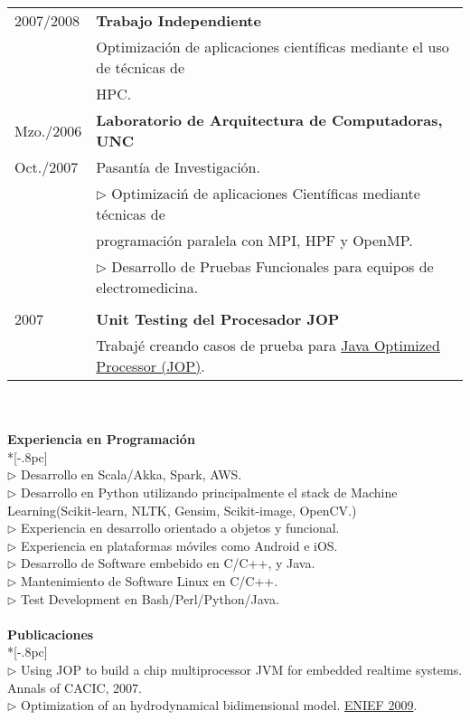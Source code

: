 \documentclass[a4paper,11pt,english]{article}
\begin{document}
\begin{tabular}{ p{2cm} l }
   2007/2008    & {\bf Trabajo Independiente}\\
		& Optimizaci\'on de aplicaciones cient\'ificas mediante el uso de t\'ecnicas de \\
                & HPC.\\
   Mzo./2006    & {\bf Laboratorio de Arquitectura de Computadoras, UNC}\\
   Oct./2007    & Pasant\'ia de Investigaci\'on.\\
		&$\triangleright$ Optimizaci\'n de aplicaciones Cient\'ificas mediante t\'ecnicas de\\
		& programaci\'on paralela  con MPI, HPF y OpenMP.\\
		&$\triangleright$ Desarrollo de Pruebas Funcionales para equipos de electromedicina.\\
\\
   2007         &{\bf Unit Testing del Procesador JOP}\\
		& Trabaj\'e creando casos de prueba para \href{http://jopdesign.com}{Java Optimized Processor (JOP)}.
\\
					
\end{tabular}
\\
\\
{\large \bf Experiencia en Programaci\'on} \\*[-.8pc]
\underline{\hspace{6in}} \\
$\triangleright$ Desarrollo en Scala/Akka, Spark, AWS.\\
$\triangleright$ Desarrollo en Python utilizando principalmente el stack de Machine Learning(Scikit-learn, NLTK, Gensim, Scikit-image, OpenCV.)\\
$\triangleright$ Experiencia en desarrollo orientado a objetos y funcional.\\
$\triangleright$ Experiencia en plataformas m\'oviles como Android e iOS.\\
$\triangleright$ Desarrollo de Software embebido en C/C++, y Java.\\
$\triangleright$ Mantenimiento de Software Linux en C/C++.\\
$\triangleright$ Test Development en Bash/Perl/Python/Java.\\
\\
{\bf Publicaciones} \\*[-.8pc]
\underline{\hspace{6in}} \\
$\triangleright$ Using JOP to build a chip multiprocessor JVM for embedded realtime systems. Annals of CACIC, 2007.\\
$\triangleright$ Optimization of an hydrodynamical bidimensional model. \href{http://enief2009.pladema.net/index.html}{ENIEF 2009}. \\
\end{document}

